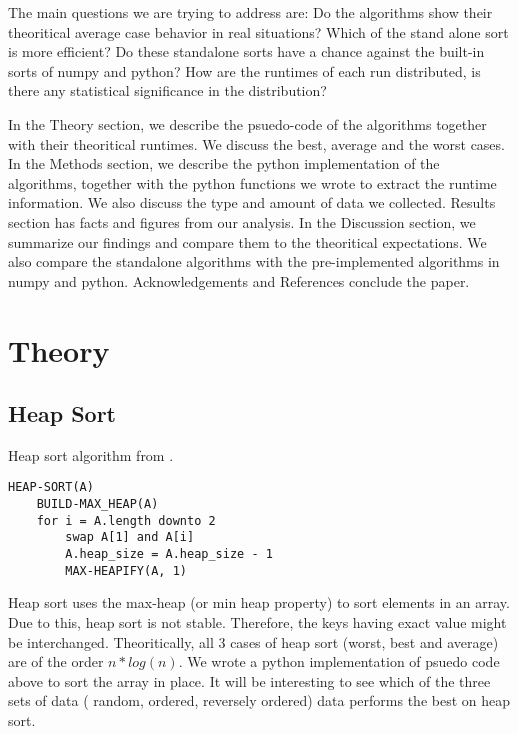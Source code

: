 \documentclass[sigconf, nonacm, natbib, screen, balance=False]{acmart}
\begin{document}
The main questions we are trying to address are: Do the algorithms show their theoritical average case behavior in real situations? 
Which of the stand alone sort is more efficient? Do these standalone sorts have a chance against the built-in sorts of numpy and python?
How are the runtimes of each run distributed, is there any statistical significance in the distribution?

In the Theory section, we describe the psuedo-code of the algorithms together with their theoritical runtimes. We discuss the best, average and the worst cases.  In the Methods section, we describe the python implementation of the algorithms, together with the python functions  we 
wrote to extract the runtime information. We also discuss the type and amount of data we collected. Results section has facts and figures from 
our analysis. In the Discussion section, we summarize our findings and compare them to the theoritical expectations. We also compare the 
standalone algorithms with the pre-implemented algorithms in numpy and python. Acknowledgements and References conclude the paper.


\section{Theory}\label{sec:theory}


\subsection{Heap Sort}\label{sec:heap sort}

\begin{listing}
  \caption{Heap sort algorithm from \citet[Ch.~6.4]{CLRS_2009}.}
  \label{lst:heap_algo}

\begin{verbatim}
HEAP-SORT(A)
    BUILD-MAX_HEAP(A)
    for i = A.length downto 2
        swap A[1] and A[i]
        A.heap_size = A.heap_size - 1
        MAX-HEAPIFY(A, 1)
\end{verbatim}
\end{listing}

Heap sort uses the max-heap (or min heap property) to sort elements in an array. Due to this, heap sort is not stable. Therefore, the keys having exact value might be interchanged. Theoritically, all 3 cases of heap sort (worst, best and average)
are of the order $n*log(n)$. We wrote a python implementation of psuedo code above to sort the array in place. It will be interesting to see which of the three sets of data ( random, ordered, reversely ordered) data performs the best on heap sort. 
\end{document}
